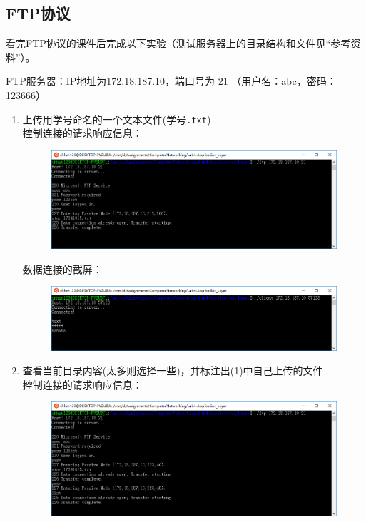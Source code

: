 \documentclass[logo,reportComp]{thesis}
\begin{document}
\begin{enumerate}
\end{enumerate}

\subsection{FTP协议}
看完FTP协议的课件后完成以下实验（测试服务器上的目录结构和文件见``参考资料''）。
\par FTP服务器：IP地址为172.18.187.10，端口号为 21 （用户名：abc，密码：123666）
\begin{enumerate}
\item 上传用学号命名的一个文本文件(学号\verb'.txt')\\
控制连接的请求响应信息：
\begin{figure}[H]
\centering
\includegraphics[width=0.8\linewidth]{fig/ftp-00.PNG}
\end{figure}

数据连接的截屏：
\begin{figure}[H]
\centering
\includegraphics[width=0.8\linewidth]{fig/ftp-01.PNG}
\end{figure}

\item 查看当前目录内容(太多则选择一些)，并标注出(1)中自己上传的文件\\
控制连接的请求响应信息：
\begin{figure}[H]
\centering
\includegraphics[width=0.8\linewidth]{fig/ftp-10.PNG}
\end{figure}


\end{enumerate}
\end{document}
